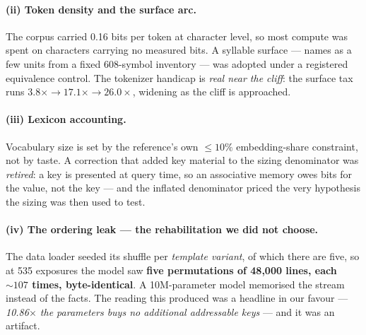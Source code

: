 \paragraph{(ii) Token density and the surface arc.} The corpus carried 0.16 bits per token at
character level, so most compute was spent on characters carrying no measured bits. A syllable
surface --- names as a few units from a fixed 608-symbol inventory --- was adopted under a
registered equivalence control. The tokenizer handicap is \emph{real near the cliff}: the surface tax
runs $3.8\times \to 17.1\times \to 26.0\times$, widening as the cliff is approached.

\paragraph{(iii) Lexicon accounting.} Vocabulary size is set by the reference's own
$\le 10\%$ embedding-share constraint, not by taste. A correction that added key material to the
sizing denominator was \emph{retired}: a key is presented at query time, so an associative memory
owes bits for the value, not the key --- and the inflated denominator priced the very hypothesis the
sizing was then used to test.

\paragraph{(iv) The ordering leak --- the rehabilitation we did not choose.} The data loader seeded
its shuffle per \emph{template variant}, of which there are five, so at 535 exposures the model saw
\textbf{five permutations of 48{,}000 lines, each ${\sim}107$ times, byte-identical}. A
10M-parameter model memorised the stream instead of the facts. The reading this produced was a
headline in our favour --- \emph{10.86$\times$ the parameters buys no additional addressable keys}
--- and it was an artifact.

